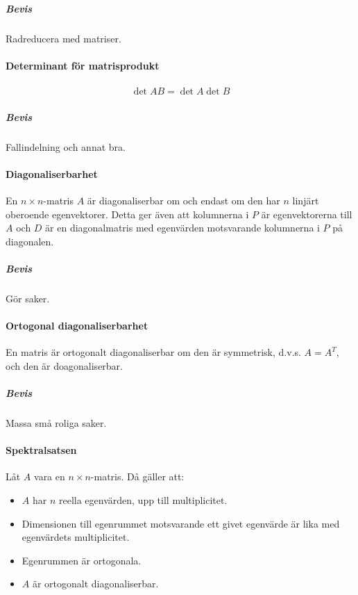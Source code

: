 \subparagraph{Bevis}
Radreducera med matriser.

\paragraph{Determinant för matrisprodukt}
\begin{align*}
	\det{AB} = \det{A}\det{B}
\end{align*}

\subparagraph{Bevis}
Fallindelning och annat bra.

\paragraph{Diagonaliserbarhet}
En $n\times n$-matris $A$ är diagonaliserbar om och endast om den har $n$ linjärt oberoende egenvektorer. Detta ger även att kolumnerna i $P$ är egenvektorerna till $A$ och $D$ är en diagonalmatris med egenvärden motsvarande kolumnerna i $P$ på diagonalen.

\subparagraph{Bevis}
Gör saker.

\paragraph{Ortogonal diagonaliserbarhet}
En matris är ortogonalt diagonaliserbar om den är symmetrisk, d.v.s. $A = A^T$, och den är doagonaliserbar.

\subparagraph{Bevis}
Massa små roliga saker.

\paragraph{Spektralsatsen}
Låt $A$ vara en $n\times n$-matris. Då gäller att:
\begin{itemize}
	\item $A$ har $n$ reella egenvärden, upp till multiplicitet.
	\item Dimensionen till egenrummet motsvarande ett givet egenvärde är lika med egenvärdets multiplicitet.
	\item Egenrummen är ortogonala.
	\item $A$ är ortogonalt diagonaliserbar.
\end{itemize}